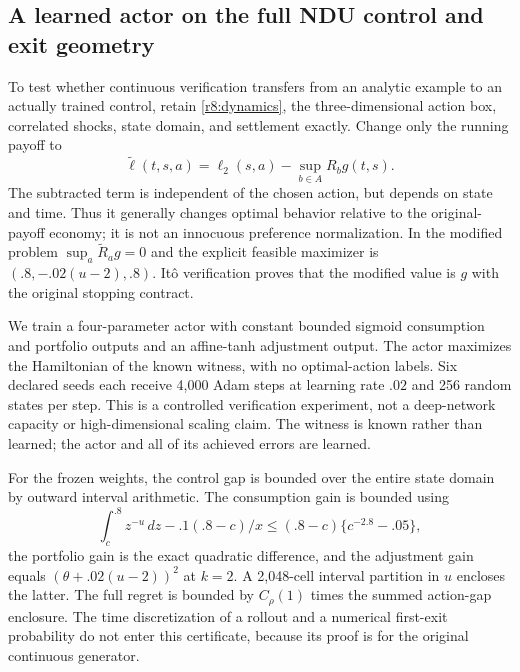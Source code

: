 

\subsection{A learned actor on the full NDU control and exit geometry}\label{r8:geometry}
To test whether continuous verification transfers from an analytic example to an actually trained control, retain \eqref{r8:dynamics}, the three-dimensional action box, correlated shocks, state domain, and settlement exactly. Change only the running payoff to
\begin{equation}
 \widetilde\ell(t,s,a)=\ell_2(s,a)-\sup_{b\in A}R_b g(t,s).\label{r8:manufactured}
\end{equation}
The subtracted term is independent of the chosen action, but depends on state and time. Thus it generally changes optimal behavior relative to the original-payoff economy; it is not an innocuous preference normalization. In the modified problem $\sup_a\widetilde R_ag=0$ and the explicit feasible maximizer is $(.8,-.02(u-2),.8)$. It\^o verification proves that the modified value is $g$ with the original stopping contract.

We train a four-parameter actor with constant bounded sigmoid consumption and portfolio outputs and an affine-tanh adjustment output. The actor maximizes the Hamiltonian of the known witness, with no optimal-action labels. Six declared seeds each receive 4,000 Adam steps at learning rate $.02$ and 256 random states per step. This is a controlled verification experiment, not a deep-network capacity or high-dimensional scaling claim. The witness is known rather than learned; the actor and all of its achieved errors are learned.

For the frozen weights, the control gap is bounded over the entire state domain by outward interval arithmetic. The consumption gain is bounded using
\[
 \int_c^{.8}z^{-u}\,dz-.1(.8-c)/x
 \leq(.8-c)\{c^{-2.8}-.05\},
\]
the portfolio gain is the exact quadratic difference, and the adjustment gain equals $(\theta+.02(u-2))^2$ at $k=2$. A 2,048-cell interval partition in $u$ encloses the latter. The full regret is bounded by $C_\rho(1)$ times the summed action-gap enclosure. The time discretization of a rollout and a numerical first-exit probability do not enter this certificate, because its proof is for the original continuous generator.



